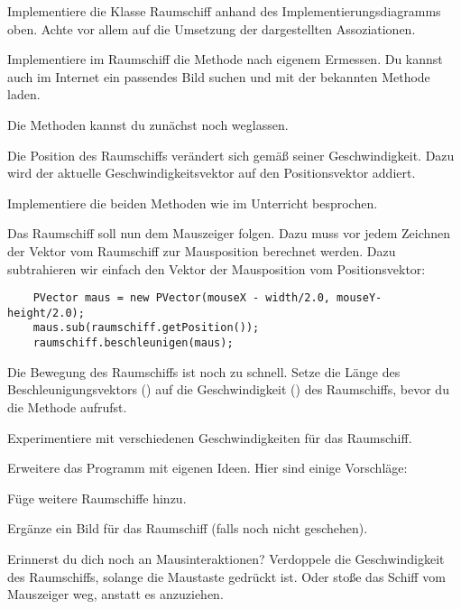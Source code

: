 \documentclass[9pt, a4paper]{arbeitsblatt}
\begin{document}

\begin{aufgabe}
\begin{enuma}
	\item Implementiere die Klasse Raumschiff anhand des Implementierungsdiagramms oben. Achte vor allem auf die Umsetzung der dargestellten Assoziationen.

	Implementiere im Raumschiff die  Methode nach eigenem Ermessen. Du kannst auch im Internet ein passendes Bild suchen und mit der bekannten  Methode laden.

	Die  Methoden kannst du zunächst noch weglassen.
	\item Die Position des Raumschiffs verändert sich gemäß seiner Geschwindigkeit. Dazu wird der aktuelle Geschwindigkeitsvektor auf den Positionsvektor addiert.

	Implementiere die beiden  Methoden wie im Unterricht besprochen.
	\item Das Raumschiff soll nun dem Mauszeiger folgen. Dazu muss vor jedem Zeichnen der Vektor vom Raumschiff zur Mausposition berechnet werden. Dazu subtrahieren wir einfach den Vektor der Mausposition vom Positionsvektor:
	\begin{verbatim}
	PVector maus = new PVector(mouseX - width/2.0, mouseY- height/2.0);
	maus.sub(raumschiff.getPosition());
	raumschiff.beschleunigen(maus);
	\end{verbatim}
	\item Die Bewegung des Raumschiffs ist noch zu schnell. Setze die Länge des Beschleunigungsvektors () auf die Geschwindigkeit () des Raumschiffs, bevor du die Methode  aufrufst.

	Experimentiere mit verschiedenen Geschwindigkeiten für das Raumschiff.
	\item Erweitere das Programm mit eigenen Ideen. Hier sind einige Vorschläge:
	\begin{smallitem}
		\item Füge weitere Raumschiffe hinzu.
		\item Ergänze ein Bild für das Raumschiff (falls noch nicht geschehen).
		\item Erinnerst du dich noch an Mausinteraktionen? Verdoppele die Geschwindigkeit des Raumschiffs, solange die Maustaste gedrückt ist. Oder stoße das Schiff vom Mauszeiger weg, anstatt es anzuziehen.
	\end{smallitem}
\end{enuma}
\end{aufgabe}
\end{document}
